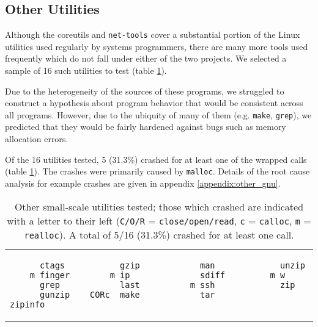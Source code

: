 \subsection{Other Utilities}
Although the coreutils and \texttt{net-tools} cover a substantial portion of the Linux utilities used regularly by systems programmers, there are many more tools used frequently which do not fall under either of the two projects. We selected a sample of 16 such utilities to test (table \ref{lst:other_utilities}).

Due to the heterogeneity of the sources of these programs, we struggled to construct a hypothesis about program behavior that would be consistent across all programs. However, due to the ubiquity of many of them (e.g. \texttt{make}, \texttt{grep}), we predicted that they would be fairly hardened against bugs such as memory allocation errors.

Of the 16 utilities tested, 5 (31.3\%) crashed for at least one of the wrapped calls (table \ref{lst:other_utilities}). The crashes were primarily caused by \texttt{malloc}. Details of the root cause analysis for example crashes are given in appendix \ref{appendix:other_gnu}.

\begin{table}[h]
\begin{tabular}{l}
\begin{lstlisting}
      ctags           gzip            man             unzip
    m finger        m ip              sdiff         m w
      grep            last          m ssh             zip
      gunzip    CORc  make            tar             zipinfo
\end{lstlisting}
\end{tabular}
\label{lst:other_utilities}
\caption{Other small-scale utilities tested; those which crashed are indicated with a letter to their left (\texttt{C/O/R} = \texttt{close/open/read}, \texttt{c} = \texttt{calloc}, \texttt{m} = \texttt{realloc}). A total of 5/16 (31.3\%) crashed for at least one call.}
\end{table}
